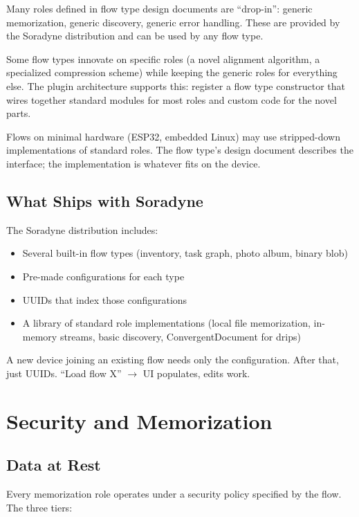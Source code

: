 \documentclass[11pt, letterpaper]{article}
\begin{document}
Many roles defined in flow type design documents are ``drop-in'': generic memorization,
generic discovery, generic error handling. These are provided by the Soradyne
distribution and can be used by any flow type.

Some flow types innovate on specific roles (a novel alignment algorithm, a specialized
compression scheme) while keeping the generic roles for everything else. The plugin
architecture supports this: register a flow type constructor that wires together
standard modules for most roles and custom code for the novel parts.

Flows on minimal hardware (ESP32, embedded Linux) may use stripped-down implementations
of standard roles. The flow type's design document describes the interface; the
implementation is whatever fits on the device.

\subsection{What Ships with Soradyne}

The Soradyne distribution includes:

\begin{itemize}[leftmargin=2em]
  \item Several built-in flow types (inventory, task graph, photo album, binary blob)
  \item Pre-made configurations for each type
  \item UUIDs that index those configurations
  \item A library of standard role implementations (local file memorization,
    in-memory streams, basic discovery, ConvergentDocument for drips)
\end{itemize}

A new device joining an existing flow needs only the configuration. After that, just
UUIDs. ``Load flow X'' $\to$ UI populates, edits work.


\newpage
\section{Security and Memorization}
\label{sec:security}

\subsection{Data at Rest}

Every memorization role operates under a security policy specified by the flow. The
three tiers:
\end{document}
